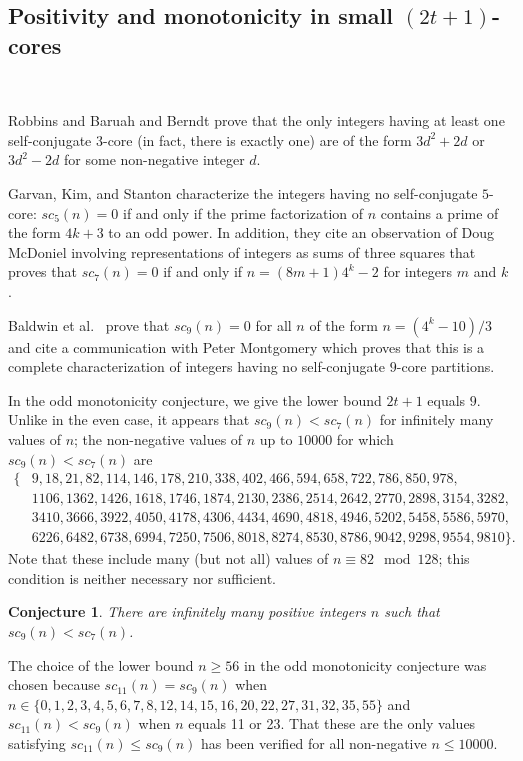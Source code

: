 \documentclass[12pt,leqno]{amsart}
\newtheorem{conj}[lem]{Conjecture}
\numberwithin{equation}{section}
\theoremstyle{definition}
\begin{document}
\subsection{Positivity and monotonicity in small $(2t+1)$-cores}\

Robbins \cite[Theorem 7]{Robbins} and Baruah and Berndt \cite[Theorem 5.2]{BB} prove that the only integers having at least one self-conjugate $3$-core (in fact, there is exactly one) are of the form $3d^2+2d$ or $3d^2-2d$ for some non-negative integer $d$. 

Garvan, Kim, and Stanton \cite{Garvan} characterize the integers having no self-conjugate $5$-core: $sc_5(n)=0$ if and only if the prime factorization of $n$ contains a prime of the form $4k+3$ to an odd power.  In addition, they cite an observation of Doug McDoniel involving representations of integers as sums of three squares that proves that $sc_7(n)=0$ if and only if $n=(8m+1)4^k-2$ for integers $m$ and $k$.

Baldwin et al.\ \cite{Baldwin} prove that $sc_9(n)=0$ for all $n$ of the form $n=(4^k-10)/3$ and cite a communication with Peter Montgomery which proves that this is a complete characterization of integers having no self-conjugate $9$-core partitions.

In the odd monotonicity conjecture, we give the lower bound $2t+1$ equals $9$.  Unlike in the even case, it appears that $sc_9(n)<sc_7(n)$ for infinitely many values of $n$; the non-negative values of $n$ up to $10000$ for which $sc_9(n)<sc_7(n)$ are  
\begin{align*}
\{ &9, 18, 21, 82, 114, 146, 178, 210, 338, 402, 466, 594, 658, 722, 786, 850, 978, \\ & 1106, 1362, 1426,  1618, 1746, 1874, 2130, 2386, 2514, 2642, 2770, 2898,  3154, 3282, \\ & 3410, 3666, 3922, 4050,  4178, 4306, 4434, 4690, 4818, 4946, 5202, 5458, 5586, 5970, \\ & 6226, 6482, 6738, 6994, 7250, 7506, 8018, 8274, 8530, 8786, 9042, 9298, 9554, 9810\}.
\end{align*}
Note that these include many (but not all) values of $n\equiv 82\mod 128$; this condition is neither necessary nor sufficient. 

\begin{conj}
There are infinitely many positive integers $n$ such that $sc_9(n)<sc_7(n)$.
\label{conj:9core}
\end{conj}

The choice of the lower bound $n\geq 56$ in the odd monotonicity conjecture was chosen because $sc_{11}(n)=sc_{9}(n)$ when $n\in\{0, 1, 2, 3, 4, 5, 6, 7, 8, 12, 14, 15, 16, 20, 22, 27, 31, 32, 35, 55\}$ and $sc_{11}(n)<sc_{9}(n)$ when $n$ equals 11 or 23. That these are the only values satisfying $sc_{11}(n)\leq sc_{9}(n)$ has been verified for all non-negative $n\leq 10000$.
\end{document}
